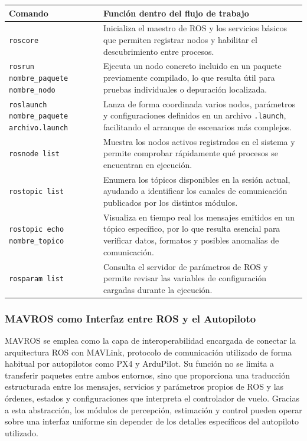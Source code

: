 \begin{longtable}{>{\raggedright\arraybackslash}p{}>{\raggedright\arraybackslash}p{}}
\textbf{Comando} & \textbf{Función dentro del flujo de trabajo} \\
\hline
\texttt{roscore} & Inicializa el maestro de ROS y los servicios básicos que permiten registrar nodos y habilitar el descubrimiento entre procesos. \\
\texttt{rosrun nombre\_paquete nombre\_nodo} & Ejecuta un nodo concreto incluido en un paquete previamente compilado, lo que resulta útil para pruebas individuales o depuración localizada. \\
\texttt{roslaunch nombre\_paquete archivo.launch} & Lanza de forma coordinada varios nodos, parámetros y configuraciones definidos en un archivo \texttt{.launch}, facilitando el arranque de escenarios más complejos. \\
\texttt{rosnode list} & Muestra los nodos activos registrados en el sistema y permite comprobar rápidamente qué procesos se encuentran en ejecución. \\
\texttt{rostopic list} & Enumera los tópicos disponibles en la sesión actual, ayudando a identificar los canales de comunicación publicados por los distintos módulos. \\
\texttt{rostopic echo nombre\_topico} & Visualiza en tiempo real los mensajes emitidos en un tópico específico, por lo que resulta esencial para verificar datos, formatos y posibles anomalías de comunicación. \\
\texttt{rosparam list} & Consulta el servidor de parámetros de ROS y permite revisar las variables de configuración cargadas durante la ejecución. \\
\end{longtable}


\subsubsection{MAVROS como Interfaz entre ROS y el Autopiloto}

MAVROS se emplea como la capa de interoperabilidad encargada de conectar la arquitectura ROS con MAVLink, protocolo de comunicación utilizado de forma habitual por autopilotos como PX4 y ArduPilot. Su función no se limita a transferir paquetes entre ambos entornos, sino que proporciona una traducción estructurada entre los mensajes, servicios y parámetros propios de ROS y las órdenes, estados y configuraciones que interpreta el controlador de vuelo. Gracias a esta abstracción, los módulos de percepción, estimación y control pueden operar sobre una interfaz uniforme sin depender de los detalles específicos del autopiloto utilizado.

